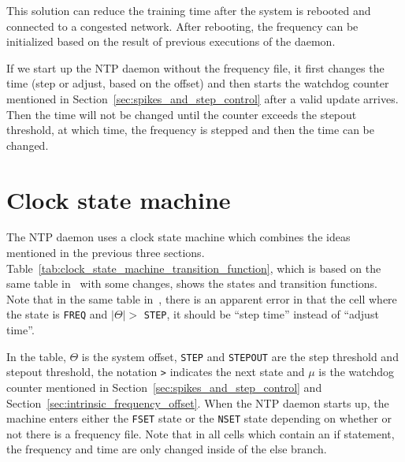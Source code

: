 This solution can reduce the training time after the system is rebooted and
connected to a congested network. After rebooting, the frequency can be
initialized based on the result of previous executions of the daemon.  

If we start up the NTP daemon without the frequency file, it first changes the
time (step or adjust, based on the offset) and then starts the watchdog counter
mentioned in Section~\ref{sec:spikes_and_step_control} after a valid update
arrives. Then the time will not be changed until the counter exceeds the
stepout threshold, at which time, the frequency is stepped and then the time can
be changed.

\section{Clock state machine}%
\label{sec:clock_state_machine}
The NTP daemon uses a clock state machine which combines the ideas mentioned in
the previous three sections.
Table~\ref{tab:clock_state_machine_transition_function}, which is based on the
same table in~\cite{redbook} with some changes, shows the states and transition
functions. Note that in the same table in~\cite{rfc5905}, there is an apparent
error in that the cell where the state is \verb|FREQ| and $|\Theta| >$
\verb|STEP|, it should be ``step time'' instead of ``adjust time''.

In the table, $\Theta$ is the system offset, \verb|STEP| and \verb|STEPOUT| are
the step threshold and stepout threshold, the notation \verb|>| indicates the
next state and $\mu$ is the watchdog counter mentioned in
Section~\ref{sec:spikes_and_step_control} and
Section~\ref{sec:intrinsic_frequency_offset}. When the NTP daemon starts up,
the machine enters either the \verb|FSET| state or the \verb|NSET| state
depending on whether or not there is a frequency file. Note that in all cells
which contain an if statement, the frequency and time are only changed inside
of the else branch.

